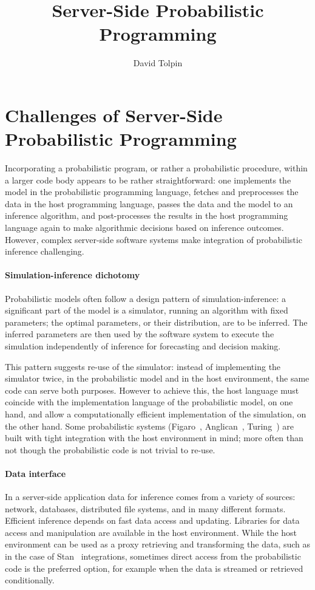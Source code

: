 \documentclass[sigplan,review]{acmart}\settopmatter{printfolios=true,printccs=false,printacmref=false}
\title{Server-Side Probabilistic Programming}
\author{David Tolpin}
\affiliation{
    \institution{PUB+}
    \country{Israel}
}
\begin{document}
\maketitle

\section{Challenges of Server-Side Probabilistic Programming}

Incorporating a probabilistic program, or rather a probabilistic
procedure, within a larger code body appears to be rather
straightforward: one implements the model in the probabilistic
programming language, fetches and preprocesses the data in the
host programming language, passes the data and the model to an
inference algorithm, and post-processes the results in the
host programming language again to make algorithmic
decisions based on inference outcomes. However, complex
server-side software systems make integration of probabilistic
inference challenging. 

\paragraph{Simulation-inference dichotomy} Probabilistic models
often follow a design pattern of simulation-inference: a
significant part of the model is a simulator, running an
algorithm with fixed parameters; the optimal parameters, or
their distribution, are to be inferred. The inferred parameters
are then used by the software system to execute the simulation
independently of inference for forecasting and decision making.

This pattern suggests re-use of the simulator: instead of
implementing the simulator twice, in the probabilistic model and
in the host environment, the same code can serve both purposes.
However to achieve this, the host language must coincide with
the implementation language of the probabilistic model, on one
hand, and allow a computationally efficient implementation of
the simulation, on the other hand. Some probabilistic systems
(Figaro~\cite{P09}, Anglican~\cite{TMY+16}, Turing~\cite{GXG18})
are built with tight integration with the host environment in
mind; more often than not though the probabilistic code is
not trivial to re-use.

\paragraph{Data interface} In a server-side application data
for inference comes from a variety of sources: network,
databases, distributed file systems, and in many different
formats. Efficient inference depends on fast data access and
updating. Libraries for data access and manipulation are
available in the host environment. While the host environment
can be used as a proxy retrieving and transforming the data,
such as in the case of Stan~\cite{Stan17} integrations,
sometimes direct access from the probabilistic code is the
preferred option, for example when the data is streamed or
retrieved conditionally. 
\end{document}
